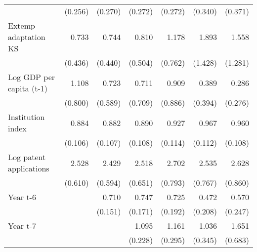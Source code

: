 \begin{table}[htbp]
\begin{tabular}{l*{6}{D{.}{.}{-1}}}
                    &     (0.256)         &     (0.270)         &     (0.272)         &     (0.272)         &     (0.340)         &     (0.371)         \\
\addlinespace
Extemp adaptation KS&       0.733         &       0.744         &       0.810         &       1.178         &       1.893         &       1.558         \\
                    &     (0.436)         &     (0.440)         &     (0.504)         &     (0.762)         &     (1.428)         &     (1.281)         \\
\addlinespace
Log GDP per capita (t-1)&       1.108         &       0.723         &       0.711         &       0.909         &       0.389         &       0.286         \\
                    &     (0.800)         &     (0.589)         &     (0.709)         &     (0.886)         &     (0.394)         &     (0.276)         \\
\addlinespace
Institution index   &       0.884         &       0.882         &       0.890         &       0.927         &       0.967         &       0.960         \\
                    &     (0.106)         &     (0.107)         &     (0.108)         &     (0.114)         &     (0.112)         &     (0.108)         \\
\addlinespace
Log patent applications&       2.528\sym{***}&       2.429\sym{***}&       2.518\sym{***}&       2.702\sym{***}&       2.535\sym{***}&       2.628\sym{***}\\
                    &     (0.610)         &     (0.594)         &     (0.651)         &     (0.793)         &     (0.767)         &     (0.860)         \\
\addlinespace
Year t-6            &                     &       0.710\sym{\%}  &       0.747         &       0.725         &       0.472\sym{*}  &       0.570         \\
                    &                     &     (0.151)         &     (0.171)         &     (0.192)         &     (0.208)         &     (0.247)         \\
\addlinespace
Year t-7            &                     &                     &       1.095         &       1.161         &       1.036         &       1.651         \\
                    &                     &                     &     (0.228)         &     (0.295)         &     (0.345)         &     (0.683)         \\

\end{tabular}
\end{table}
